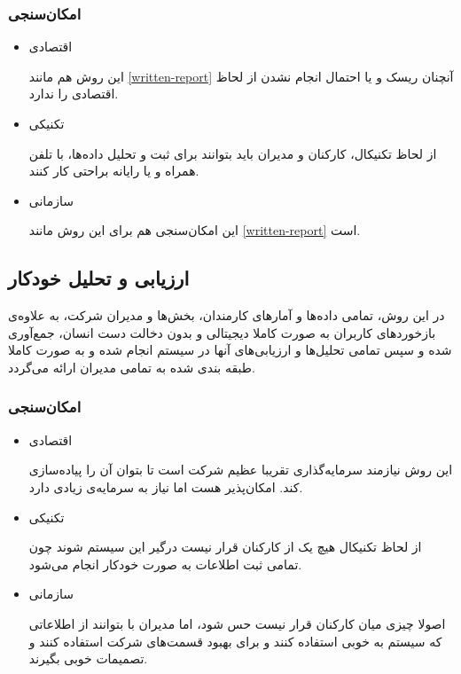 \documentclass[12pt, dvipsnames, svgnames, x11names,]{article}
\begin{document}
\subsubsection{امکان‌‌سنجی}
    \begin{itemize}
        \item 
        اقتصادی
        
           این روش هم مانند \ref{written-report} آنچنان ریسک و یا احتمال انجام نشدن از لحاظ اقتصادی را ندارد.
        \item 
        تکنیکی
        
        از لحاظ تکنیکال، کارکنان و مدیران باید بتوانند برای ثبت و تحلیل داده‌ها، با تلفن همراه و یا رایانه براحتی کار کنند.
        \item 
        سازمانی
        
        این امکان‌سنجی هم برای این روش مانند \ref{written-report} است.
        
    \end{itemize}


\subsection{ارزیابی و تحلیل خودکار }\label{full-digital}
در این روش، تمامی داده‌ها و آمار‌های کارمندان، بخش‌ها و مدیران شرکت، به علاوه‌ی بازخورد‌های کاربران به صورت کاملا دیجیتالی و بدون دخالت دست انسان، جمع‌آوری شده و سپس تمامی تحلیل‌ها و ارزیابی‌های آنها در سیستم  انجام شده و به صورت کاملا طبقه بندی شده به تمامی مدیران ارائه می‌گردد.

\subsubsection{امکان‌سنجی}
    \begin{itemize}
        \item 
        اقتصادی
        
        این روش نیازمند سرمایه‌گذاری تقریبا عظیم شرکت  است تا بتوان آن را پیاده‌سازی کند. امکان‌پذیر هست اما نیاز به سرمایه‌ی زیادی دارد.
        \item 
        تکنیکی
        
        از لحاظ تکنیکال هیچ یک از کارکنان قرار نیست درگیر این سیستم شوند چون تمامی ثبت اطلاعات به صورت خودکار انجام می‌شود.
        \item 
        سازمانی
        
        اصولا چیزی میان کارکنان قرار نیست حس شود، اما مدیران با بتوانند از اطلاعاتی که سیستم  به خوبی استفاده کنند و برای بهبود قسمت‌های شرکت استفاده کنند و تصمیمات خوبی بگیرند.
    \end{itemize}
\end{document}
